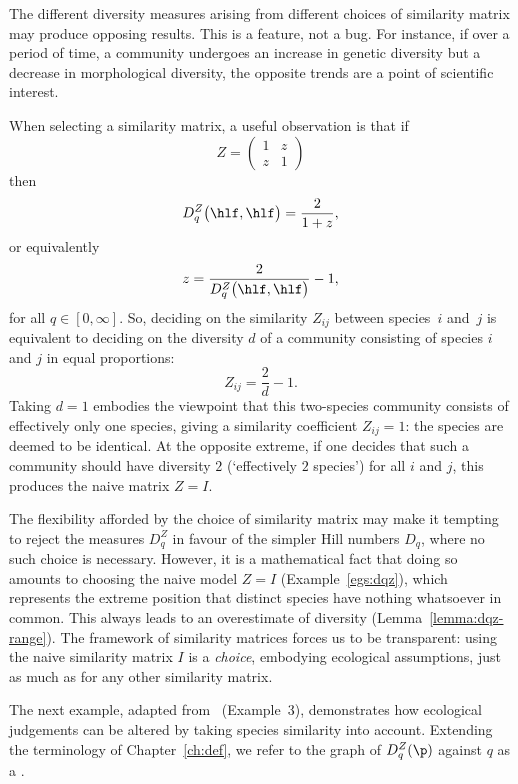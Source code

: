 The different diversity measures arising from different choices of
similarity matrix may produce opposing results.  This is a feature, not
a bug.  For instance, if over a period of time, a community undergoes an
increase in genetic diversity but a decrease in morphological%
%
%
%
diversity, the opposite trends are a point of scientific interest.

When selecting a similarity%
%
% 
matrix, a useful observation is that if
\[
Z =
\begin{pmatrix}
1       &z      \\
z       &1
\end{pmatrix}
\]
then
\[
D_q^Z\bigl( \hlf, \hlf \bigr)
=
\frac{2}{1 + z},
\]
or equivalently%
% 
\[
z
=
\frac{2}{D_q^Z\bigl(\hlf, \hlf\bigr)} - 1,
\]
for all $q \in [0, \infty]$.  So, deciding on the similarity $Z_{ij}$
between species~$i$ and~$j$ is equivalent to deciding on the diversity $d$
of a community consisting of species $i$ and $j$ in equal proportions:
\[
Z_{ij}
=
\frac{2}{d} - 1.
\]
Taking $d = 1$ embodies the viewpoint that this two-species community
consists of effectively only one species, giving a similarity coefficient
$Z_{ij} = 1$: the species are deemed to be identical.  At the opposite
extreme, if one decides that such a community should have diversity $2$
(`effectively $2$ species') for all $i$ and $j$, this produces the naive
matrix $Z = I$.

The flexibility afforded by the choice of similarity matrix may make it
tempting to reject the measures $D_q^Z$ in favour of the simpler Hill
numbers $D_q$, where no such choice is necessary.  However, it is a
mathematical fact that doing so amounts to choosing the naive%
%
%
model $Z = I$ (Example~\ref{egs:dqz}), which
represents the extreme position that distinct species have nothing
whatsoever in common.  This always leads to an overestimate of diversity
(Lemma~\ref{lemma:dqz-range}).  The framework of similarity matrices forces
us to be transparent: using the naive similarity matrix $I$ is a
\emph{choice}, embodying ecological assumptions, just as much as for
any other similarity matrix.

The next example, adapted from~\cite{MDISS} (Example~3), demonstrates how
ecological judgements can be altered by taking species similarity into
account.  Extending the terminology of Chapter~\ref{ch:def}, we refer to
the graph of $D_q^Z(\p)$ against $q$ as a .

